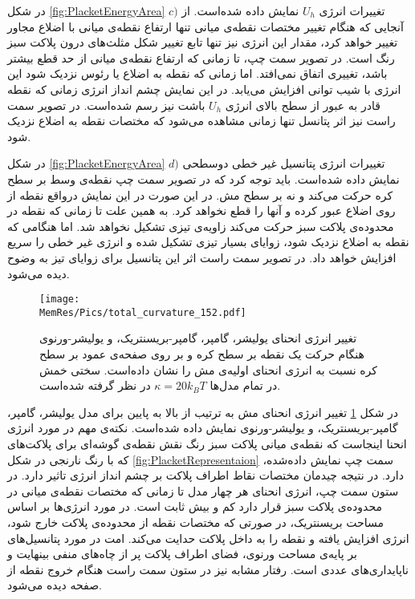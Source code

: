 در شکل 
\ref{fig:PlacketEnergyArea} $c)$
تغییرات انرژی 
$U_h$
 نمایش داده شده‌است. از آنجایی که هنگام تغییر مختصات نقطه‌ی میانی تنها ارتفاع نقطه‌ی میانی با اضلاع مجاور تغییر خواهد کرد، مقدار این انرژی نیز تنها تابع تغییر شکل مثلث‌های درون پلاکت سبز رنگ است. در تصویر سمت چپ، تا زمانی که ارتفاع نقطه‌ی میانی از حد قطع بیشتر باشد، تغییری اتفاق نمی‌افتد. اما زمانی که نقطه به اضلاع یا رئوس نزدیک شود این انرژی با شیب توانی افزایش می‌یابد. در این نمایش چشم انداز انرژی زمانی که نقطه قادر به عبور از سطح بالای انرژی 
 $U_h$
 باشت نیز رسم شده‌است. در تصویر سمت راست نیز اثر پتانسل تنها زمانی مشاهده می‌شود که مختصات نقطه به اضلاع نزدیک شود.
 
 در شکل 
\ref{fig:PlacketEnergyArea} $d)$
تغییرات انرژی پتانسیل غیر خطی دوسطحی نمایش داده شده‌است. باید توجه کرد که در تصویر سمت چپ نقطه‌ی وسط بر سطح کره حرکت می‌کند و نه بر سطح مش. در این صورت در این نمایش درواقع نقطه از روی اضلاع عبور کرده و آنها را قطع نخواهد کرد. به همین علت تا زمانی که نقطه در محدوده‌ی پلاکت سبز حرکت می‌کند زاویه‌ی تیزی تشکیل نخواهد شد. اما هنگامی که نقطه به اضلاع نزدیک شود، زوایای بسیار تیزی تشکیل شده و انرژی غیر خطی را سریع افزایش خواهد داد. در تصویر سمت راست اثر این پتانسیل برای زوایای تیز به وضوح دیده می‌شود.


\begin{figure}[htbp]
\begin{center}
\texttt{[image: \\MemRes/Pics/total\_curvature\_152.pdf]}
\caption{
تغییر انرژی انحنای یولیشر، گامپر، گامپر-بریسنتریک، و یولیشر-ورنوی هنگام حرکت یک نقطه بر سطح کره و بر روی صفحه‌ی عمود بر سطح کره نسبت به انرژی انحنای اولیه‌ی مش را نشان داده‌است. سختی خمش در تمام مدل‌ها 
$\kappa=20k_BT$
در نظر گرفته شده‌است.
}
\label{fig:PlacketEnergy}
\end{center}
\end{figure}


در شکل
\ref{fig:PlacketEnergy}
تغییر انرژی انحنای مش به ترتیب از بالا به پایین برای مدل یولیشر، گامپر، گامپر-بریسنتریک، و یولیشر-ورنوی نمایش داده شده‌است. نکته‌ی مهم در مورد انرژی انحنا اینجاست که نقطه‌ی میانی پلاکت سبز رنگ نقش نقطه‌ی گوشه‌ای برای پلاکت‌های که با رنگ نارنجی در شکل
\ref{fig:PlacketRepresentaion}
سمت چپ نمایش داده‌شده، دارد. در نتیجه چیدمان مختصات نقاط اطراف پلاکت بر چشم انداز انرژی تاثیر دارد. در ستون سمت چپ، انرژی انحنای هر چهار مدل تا زمانی که مختصات نقطه‌ی میانی در محدود‌ه‌ی پلاکت سبز قرار دارد کم و بیش ثابت است. در مورد انرژی‌ها بر اساس مساحت بریسنتریک، در صورتی که مختصات نقطه از محدوده‌ی پلاکت خارج شود، انرژی افزایش یافته و نقطه را به داخل پلاکت حدایت می‌کند. امت در مورد پتانسیل‌های بر پایه‌ی مساحت ورنوی، فضای اطراف پلاکت پر از چاه‌های منفی بینهایت و ناپایداری‌های عددی‌ است. رفتار مشابه نیز در ستون سمت راست هنگام خروج نقطه از صفحه دیده می‌شود. 


